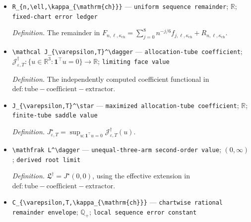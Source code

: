 \documentclass{article}
\begin{document}
\begin{itemize}
  \par\smallskip\noindent\emph{Definition.} The coefficient arrays for \(0\le j\le8\) defined by the finite-lattice coefficient extractor separately for the prior second moment, every denominator, and every numerator.
  \item \texttt{R\_\allowbreak{}\{n,\allowbreak{}\textbackslash{}\allowbreak{}ell,\allowbreak{}\textbackslash{}\allowbreak{}kappa\_\allowbreak{}\{\textbackslash{}\allowbreak{}mathrm\{ch\}\allowbreak{}\}\allowbreak{}\}\allowbreak{}} --- \texttt{uniform sequence remainder}; \(\mathbb R\); \texttt{fixed-\allowbreak{}chart error ledger}
  \par\smallskip\noindent\emph{Definition.} The remainder in \(F_{n,\ell,\kappa_{\mathrm{ch}}}=\sum_{j=0}^8n^{-j/6}f_{j,\ell,\kappa_{\mathrm{ch}}}+R_{n,\ell,\kappa_{\mathrm{ch}}}\).
  \item \texttt{\textbackslash{}\allowbreak{}mathcal J\_\allowbreak{}\{\textbackslash{}\allowbreak{}varepsilon,\allowbreak{}T\}\allowbreak{}\textasciicircum{}\textbackslash{}\allowbreak{}dagger} --- \texttt{allocation-\allowbreak{}tube coefficient}; \(\mathcal J_{\varepsilon,T}^\dagger:\{u\in\mathbb R^3:\mathbf1^\top u=0\}\to\mathbb R\); \texttt{limiting face value}
  \par\smallskip\noindent\emph{Definition.} The independently computed coefficient functional in \(\mathrm{def:tube-coefficient-extractor}\).
  \item \texttt{J\_\allowbreak{}\{\textbackslash{}\allowbreak{}varepsilon,\allowbreak{}T\}\allowbreak{}\textasciicircum{}\textbackslash{}\allowbreak{}star} --- \texttt{maximized allocation-\allowbreak{}tube coefficient}; \(\mathbb R\); \texttt{finite-\allowbreak{}tube saddle value}
  \par\smallskip\noindent\emph{Definition.} \(J_{\varepsilon,T}^\star=\sup_{u:\mathbf1^\top u=0}\mathcal J_{\varepsilon,T}^\dagger(u)\).
  \item \texttt{\textbackslash{}\allowbreak{}mathfrak L\textasciicircum{}\textbackslash{}\allowbreak{}dagger} --- \texttt{unequal-\allowbreak{}three-\allowbreak{}arm second-\allowbreak{}order value}; \((0,\infty)\); \texttt{derived root limit}
  \par\smallskip\noindent\emph{Definition.} \(\mathfrak L^\dagger=J^\star(0,0)\), using the effective extension in \(\mathrm{def:tube-coefficient-extractor}\).
  \item \texttt{C\_\allowbreak{}\{\textbackslash{}\allowbreak{}varepsilon,\allowbreak{}T,\allowbreak{}\textbackslash{}\allowbreak{}kappa\_\allowbreak{}\{\textbackslash{}\allowbreak{}mathrm\{ch\}\allowbreak{}\}\allowbreak{}\}\allowbreak{}} --- \texttt{chartwise rational remainder envelope}; \(\mathbb Q_+\); \texttt{local sequence error constant}

\end{itemize}
\end{document}
